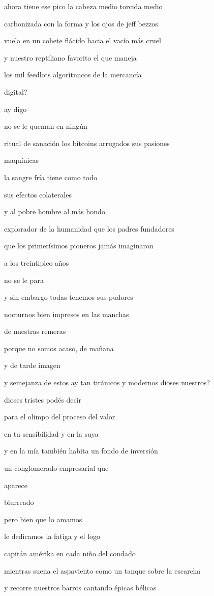 \documentclass[
]{book}
\begin{document}
ahora tiene ese pico la cabeza medio torcida medio

carbonizada con la forma y los ojos de jeff bezzos

vuela en un cohete flácido hacia el vacío más cruel

y nuestro reptiliano favorito el que maneja

los mil feedlots algorítmicos de la mercancía

digital?

ay digo

no se le queman en ningún

ritual de sanación los bitcoins arrugados sus pasiones

maquínicas

la sangre fría tiene como todo

sus efectos colaterales

y al pobre hombre al más hondo

explorador de la humanidad que los padres fundadores

que los primerísimos pioneros jamás imaginaron

a los treintipico años

no se le para

y sin embargo todas tenemos sus pudores

nocturnos bien impresos en las manchas

de nuestras remeras

porque no somos acaso, de mañana

y de tarde imagen

y semejanza de estos ay tan tiránicos y modernos dioses nuestros?

dioses tristes podés decir

para el olimpo del proceso del valor

en tu sensibilidad y en la suya

y en la mía también habita un fondo de inversión

un conglomerado empresarial que

aparece

blurreado

pero bien que lo amamos

le dedicamos la fatiga y el logo

capitán amérika en cada niño del condado

mientras suena el aspaviento como un tanque sobre la escarcha

y recorre nuestros barros cantando épicas bélicas
\end{document}
